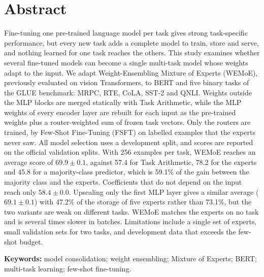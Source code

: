 \chapter*{Abstract}

Fine-tuning one pre-trained language model per task gives strong task-specific performance, but every new task adds a complete model to train, store and serve, and nothing learned for one task reaches the others. This study examines whether several fine-tuned models can become a single multi-task model whose weights adapt to the input. We adapt Weight-Ensembling Mixture of Experts (WEMoE), previously evaluated on vision Transformers, to BERT and five binary tasks of the GLUE benchmark: MRPC, RTE, CoLA, SST-2 and QNLI. Weights outside the MLP blocks are merged statically with Task Arithmetic, while the MLP weights of every encoder layer are rebuilt for each input as the pre-trained weights plus a router-weighted sum of frozen task vectors. Only the routers are trained, by Few-Shot Fine-Tuning (FSFT) on labelled examples that the experts never saw. All model selection uses a development split, and scores are reported on the official validation splits. With 256 examples per task, WEMoE reaches an average score of $69.9\pm0.1$, against 57.4 for Task Arithmetic, 78.2 for the experts and 45.8 for a majority-class predictor, which is 59.1\% of the gain between the majority class and the experts. Coefficients that do not depend on the input reach only $58.4\pm0.0$. Upscaling only the first MLP layer gives a similar average ($69.1\pm0.1$) with 47.2\% of the storage of five experts rather than 73.1\%, but the two variants are weak on different tasks. WEMoE matches the experts on no task and is several times slower in batches. Limitations include a single set of experts, small validation sets for two tasks, and development data that exceeds the few-shot budget.

\vspace{3mm}
\noindent\textbf{Keywords:} model consolidation; weight ensembling; Mixture of Experts; BERT; multi-task learning; few-shot fine-tuning.
